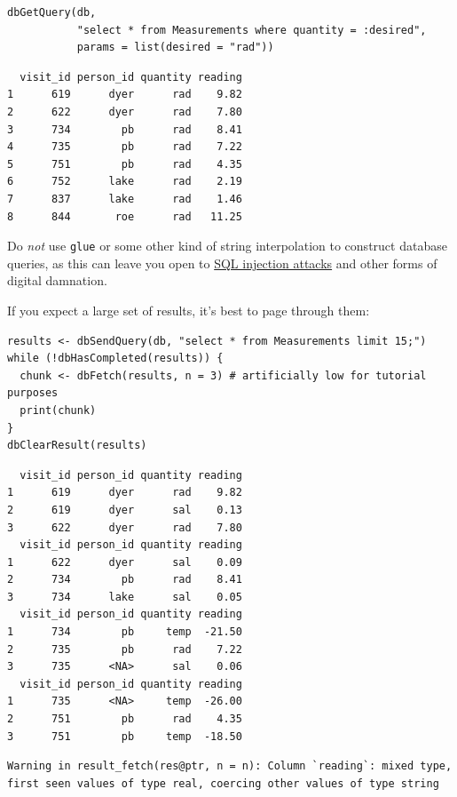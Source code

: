 \begin{lstlisting}
dbGetQuery(db,
           "select * from Measurements where quantity = :desired",
           params = list(desired = "rad"))
\end{lstlisting}

\begin{lstlisting}
  visit_id person_id quantity reading
1      619      dyer      rad    9.82
2      622      dyer      rad    7.80
3      734        pb      rad    8.41
4      735        pb      rad    7.22
5      751        pb      rad    4.35
6      752      lake      rad    2.19
7      837      lake      rad    1.46
8      844       roe      rad   11.25
\end{lstlisting}

\noindent
Do \emph{not} use \texttt{glue} or some other kind of string interpolation
to construct database queries,
as this can leave you open to
\href{https://en.wikipedia.org/wiki/SQL_injection}{SQL injection attacks}
and other forms of digital damnation.

If you expect a large set of results,
it's best to page through them:

\begin{lstlisting}
results <- dbSendQuery(db, "select * from Measurements limit 15;")
while (!dbHasCompleted(results)) {
  chunk <- dbFetch(results, n = 3) # artificially low for tutorial purposes
  print(chunk)
}
dbClearResult(results)
\end{lstlisting}

\begin{lstlisting}
  visit_id person_id quantity reading
1      619      dyer      rad    9.82
2      619      dyer      sal    0.13
3      622      dyer      rad    7.80
  visit_id person_id quantity reading
1      622      dyer      sal    0.09
2      734        pb      rad    8.41
3      734      lake      sal    0.05
  visit_id person_id quantity reading
1      734        pb     temp  -21.50
2      735        pb      rad    7.22
3      735      <NA>      sal    0.06
  visit_id person_id quantity reading
1      735      <NA>     temp  -26.00
2      751        pb      rad    4.35
3      751        pb     temp  -18.50
\end{lstlisting}

\begin{lstlisting}
Warning in result_fetch(res@ptr, n = n): Column `reading`: mixed type,
first seen values of type real, coercing other values of type string
\end{lstlisting}

